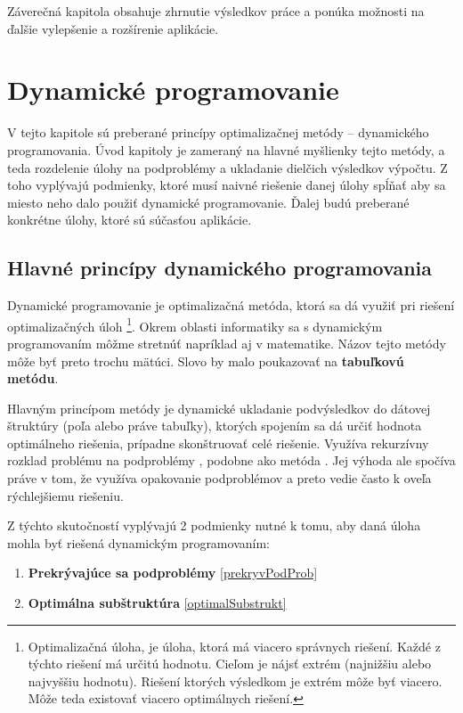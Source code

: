 Záverečná kapitola obsahuje zhrnutie výsledkov práce a ponúka možnosti na ďalšie vylepšenie a rozšírenie aplikácie.



\chapter{Dynamické programovanie}
\label{dynamickeProgramovanie}

V tejto kapitole sú preberané princípy optimalizačnej metódy -- dynamického programovania. Úvod kapitoly je zameraný na hlavné myšlienky tejto metódy, a teda rozdelenie úlohy na podproblémy a ukladanie dielčich výsledkov výpočtu. Z toho vyplývajú podmienky, ktoré musí naivné riešenie danej úlohy spĺňať aby sa miesto neho dalo použiť dynamické programovanie. Ďalej budú preberané konkrétne úlohy, ktoré sú súčasťou aplikácie. 

\section{Hlavné princípy dynamického programovania}

Dynamické programovanie je optimalizačná metóda, ktorá sa dá využiť pri riešení optimalizačných úloh \footnote{Optimalizačná úloha, je úloha, ktorá má viacero správnych riešení. Každé z týchto riešení má určitú hodnotu. Cieľom je nájsť extrém (najnižšiu alebo najvyššiu hodnotu). Riešení ktorých výsledkom je extrém môže byť viacero. Môže teda existovať viacero optimálnych riešení.\cite{IntroductionToAlg}}. Okrem oblasti informatiky sa s dynamickým programovaním môžme stretnúť napríklad aj v matematike. Názov tejto metódy môže byť preto trochu mätúci. Slovo  by malo poukazovať na \textbf{tabuľkovú metódu}.

Hlavným princípom metódy je dynamické ukladanie podvýsledkov do dátovej štruktúry (poľa alebo práve tabuľky), ktorých spojením sa dá určiť hodnota optimálneho riešenia, prípadne skonštruovať celé riešenie. Využíva rekurzívny rozklad problému na podproblémy , podobne ako metóda . Jej výhoda ale spočíva práve v tom, že využíva opakovanie podproblémov a preto vedie často k oveľa rýchlejšiemu riešeniu.

Z týchto skutočností vyplývajú 2 podmienky nutné k tomu, aby daná úloha mohla byť riešená dynamickým programovaním:

\begin{enumerate}
    \item \textbf{Prekrývajúce sa podproblémy} \ref{prekryvPodProb}
    \item \textbf{Optimálna subštruktúra} \ref{optimalSubstrukt}
\end{enumerate}


